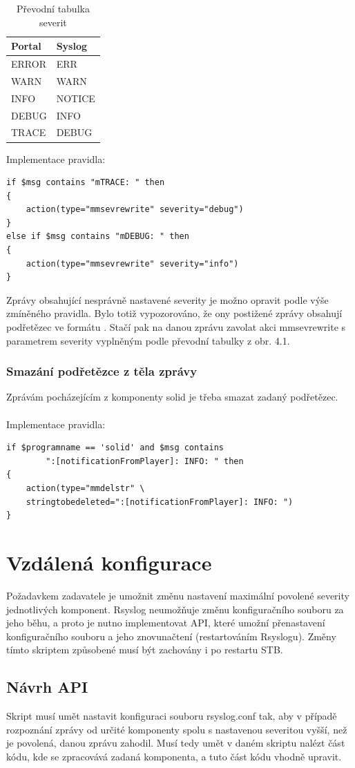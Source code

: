 \documentclass[thesis=B,czech]{FITthesis}[2012/06/26]
\begin{document}
\begin{table}[H]
\centering
	\caption{Převodní tabulka severit}	\begin{tabular}{|l|l|}\hline
		Portal		& Syslog			\tabularnewline \hline \hline
		ERROR		& ERR			\tabularnewline \hline
		WARN		& WARN			\tabularnewline \hline
		INFO		& NOTICE			\tabularnewline \hline
		DEBUG		& INFO			\tabularnewline \hline
		TRACE		& DEBUG			\tabularnewline \hline
	\end{tabular}
\end{table}
Implementace pravidla:
\begin{lstlisting}[style=RainerScriptStyle]
if $msg contains "mTRACE: " then
{
	action(type="mmsevrewrite" severity="debug")
}
else if $msg contains "mDEBUG: " then
{
	action(type="mmsevrewrite" severity="info")
}
\end{lstlisting}
Zprávy obsahující nesprávně nastavené severity je možno opravit podle výše zmíněného pravidla. Bylo totiž vypozorováno, že ony postižené zprávy obsahují podřetězec ve formátu . Stačí pak na danou zprávu zavolat akci mmsevrewrite s parametrem severity vyplněným podle převodní tabulky z obr. 4.1.

\subsubsection{Smazání podřetězce z těla zprávy}
Zprávám pocházejícím z komponenty solid je třeba smazat zadaný podřetězec.
\\
\\
Implementace pravidla:
\begin{lstlisting}[style=RainerScriptStyle]
if $programname == 'solid' and $msg contains
		":[notificationFromPlayer]: INFO: " then
{
	action(type="mmdelstr" \ 
	stringtobedeleted=":[notificationFromPlayer]: INFO: ")
}
\end{lstlisting}


\section{Vzdálená konfigurace}
Požadavkem zadavatele je umožnit změnu nastavení maximální povolené severity jednotlivých komponent. Rsyslog neumožňuje změnu konfiguračního souboru za jeho běhu, a proto je nutno implementovat API, které umožní přenastavení konfiguračního souboru a jeho znovunačtení (restartováním Rsyslogu).
Změny tímto skriptem způsobené musí být zachovány i po restartu STB.

\subsection{Návrh API}
Skript musí umět nastavit konfiguraci souboru rsyslog.conf tak, aby v případě rozpoznání zprávy od určité komponenty spolu s nastavenou severitou vyšší, než je povolená, danou zprávu zahodil. 
Musí tedy umět v daném skriptu nalézt část kódu, kde se zpracovává zadaná komponenta, a tuto část kódu vhodně upravit.
\end{document}
